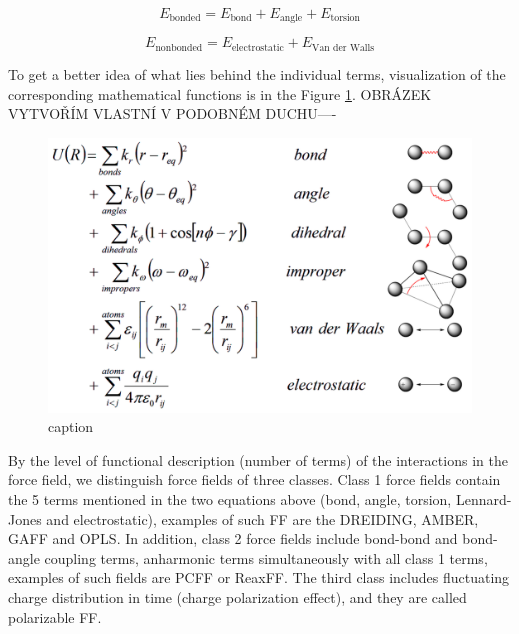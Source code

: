 \begin{equation}\label{eq:ff2}
	E_{\text{bonded}} = E_{\text{bond}} + E_{\text{angle}} + E_{\text{torsion}}
\end{equation}

\begin{equation}\label{eq:ff3}
	E_{\text{nonbonded}} = E_{\text{electrostatic}} + E_{\text{Van der Walls}}
\end{equation}

To get a better idea of what lies behind the individual terms, visualization of the corresponding mathematical functions is in the Figure \ref{fig:ff}. OBRÁZEK VYTVOŘÍM VLASTNÍ V PODOBNÉM DUCHU----

\begin{figure}[htb!]
	\centering
	\includegraphics[width=1.0\linewidth]{img/ff.png} 
	\caption{caption}
	\label{fig:ff}    
\end{figure}  

\newpage
By the level of functional description (number of terms) of the interactions in the force field, we distinguish force fields of three classes. Class 1 force fields contain the 5 terms mentioned in the two equations above (bond, angle, torsion, Lennard-Jones and electrostatic), examples of such FF are the DREIDING, AMBER, GAFF and OPLS. In addition, class 2 force fields include bond-bond and bond-angle coupling terms, anharmonic terms simultaneously with all class 1 terms, examples of such fields are PCFF or ReaxFF.  The third class includes fluctuating charge distribution in time (charge polarization effect), and they are called polarizable FF. \cite{vanommeslaeghe_molecular_2014}

